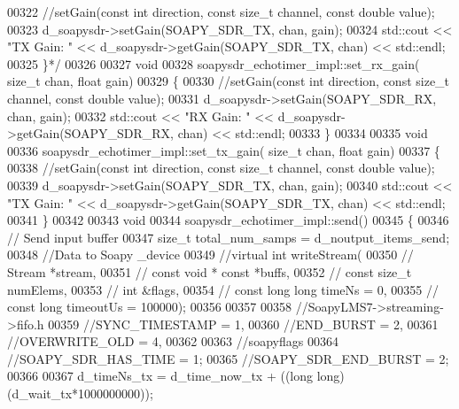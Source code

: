 \begin{DoxyCode}
00322 \textcolor{comment}{      //setGain(const int direction, const size\_t channel, const double value);}
00323 \textcolor{comment}{      d\_soapysdr->setGain(SOAPY\_SDR\_TX, chan, gain);}
00324 \textcolor{comment}{      std::cout << "TX Gain: "  << d\_soapysdr->getGain(SOAPY\_SDR\_TX, chan) << std::endl;}
00325 \textcolor{comment}{    \}*/}
00326 
00327     \textcolor{keywordtype}{void}
00328     soapysdr_echotimer_impl::set_rx_gain( \textcolor{keywordtype}{size\_t} chan, \textcolor{keywordtype}{float} gain)
00329     \{
00330       \textcolor{comment}{//setGain(const int direction, const size\_t channel, const double value);}
00331       d_soapysdr->setGain(SOAPY_SDR_RX, chan, gain);
00332       std::cout << \textcolor{stringliteral}{"RX Gain: "}  << d_soapysdr->getGain(SOAPY_SDR_RX, chan) << std::endl;
00333     \}
00334 
00335     \textcolor{keywordtype}{void}
00336     soapysdr_echotimer_impl::set_tx_gain( \textcolor{keywordtype}{size\_t} chan, \textcolor{keywordtype}{float} gain)
00337     \{
00338       \textcolor{comment}{//setGain(const int direction, const size\_t channel, const double value);}
00339       d_soapysdr->setGain(SOAPY_SDR_TX, chan, gain);
00340       std::cout << \textcolor{stringliteral}{"TX Gain: "}  << d_soapysdr->getGain(SOAPY_SDR_TX, chan) << std::endl;
00341     \}
00342 
00343     \textcolor{keywordtype}{void}
00344     soapysdr_echotimer_impl::send()
00345     \{
00346       \textcolor{comment}{// Send input buffer}
00347       \textcolor{keywordtype}{size\_t} total\_num\_samps = d_noutput_items_send;
00348       \textcolor{comment}{//Data to Soapy \_device}
00349       \textcolor{comment}{//virtual int writeStream(}
00350       \textcolor{comment}{//        Stream *stream,}
00351       \textcolor{comment}{//        const void * const *buffs,}
00352       \textcolor{comment}{//        const size\_t numElems,}
00353       \textcolor{comment}{//        int &flags,}
00354       \textcolor{comment}{//        const long long timeNs = 0,}
00355       \textcolor{comment}{//        const long timeoutUs = 100000);}
00356 
00357 
00358       \textcolor{comment}{//SoapyLMS7->streaming->fifo.h}
00359       \textcolor{comment}{//SYNC\_TIMESTAMP = 1,}
00360       \textcolor{comment}{//END\_BURST = 2,}
00361       \textcolor{comment}{//OVERWRITE\_OLD = 4,}
00362 
00363       \textcolor{comment}{//soapyflags}
00364       \textcolor{comment}{//SOAPY\_SDR\_HAS\_TIME = 1;}
00365       \textcolor{comment}{//SOAPY\_SDR\_END\_BURST = 2;}
00366 
00367       d_timeNs_tx = d_time_now_tx + ((\textcolor{keywordtype}{long} long) (d_wait_tx*1000000000));

\end{DoxyCode}
